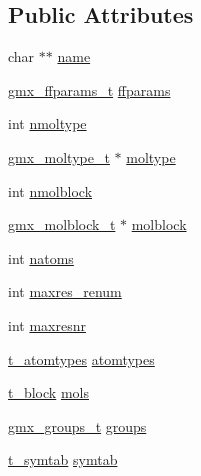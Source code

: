 \subsection*{\-Public \-Attributes}
\begin{DoxyCompactItemize}
\item 
char $\ast$$\ast$ \hyperlink{structgmx__mtop__t_a636e205ae74f173d72878c8bd82814b6}{name}
\item 
\hyperlink{structgmx__ffparams__t}{gmx\-\_\-ffparams\-\_\-t} \hyperlink{structgmx__mtop__t_a4b1d67c93dac557e9c7ef38aa45ecde0}{ffparams}
\item 
int \hyperlink{structgmx__mtop__t_a37880d571aca73e3f3c180f6136c0cad}{nmoltype}
\item 
\hyperlink{structgmx__moltype__t}{gmx\-\_\-moltype\-\_\-t} $\ast$ \hyperlink{structgmx__mtop__t_aa3e455f20a3f57d1abfed97f28f210cc}{moltype}
\item 
int \hyperlink{structgmx__mtop__t_afc42713ad6603011999e9850a5e7ce57}{nmolblock}
\item 
\hyperlink{structgmx__molblock__t}{gmx\-\_\-molblock\-\_\-t} $\ast$ \hyperlink{structgmx__mtop__t_aee62e3f575655fb2e0ea71a7ea017471}{molblock}
\item 
int \hyperlink{structgmx__mtop__t_a0aace8a1c972afa611e4fd942152882d}{natoms}
\item 
int \hyperlink{structgmx__mtop__t_ad126499e230240338604ba42b0092ef7}{maxres\-\_\-renum}
\item 
int \hyperlink{structgmx__mtop__t_a87b58a763d5664f5bfae662fc4bd183a}{maxresnr}
\item 
\hyperlink{structt__atomtypes}{t\-\_\-atomtypes} \hyperlink{structgmx__mtop__t_ae8639ad509d382efc1bbd53868f96fa3}{atomtypes}
\item 
\hyperlink{structt__block}{t\-\_\-block} \hyperlink{structgmx__mtop__t_aef706344607b8072524fd48cd6d91d59}{mols}
\item 
\hyperlink{structgmx__groups__t}{gmx\-\_\-groups\-\_\-t} \hyperlink{structgmx__mtop__t_aaade49c94099ff7de3ea2d5f108041d6}{groups}
\item 
\hyperlink{structt__symtab}{t\-\_\-symtab} \hyperlink{structgmx__mtop__t_a3e93edbb63dc53331d86c5244eb79f07}{symtab}
\end{DoxyCompactItemize}


